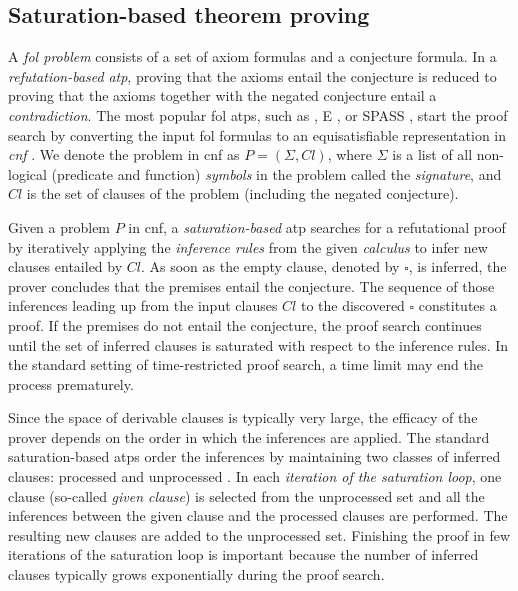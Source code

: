 
\subsection{Saturation-based theorem proving}
\label{sec:saturation}

A \emph{\acrfull{fol} problem} consists of a set of axiom formulas and a conjecture formula.
In a \emph{refutation-based} \emph{\acrfull{atp}},
proving that the axioms entail the conjecture
is reduced to proving that the axioms together with the negated conjecture entail a \emph{contradiction}.
The most popular \gls{fol} \glspl{atp}, such as \Vampire{} \cite{DBLP:conf/cav/KovacsV13}, E \cite{Schulz2019}, or SPASS \cite{DBLP:conf/cade/WeidenbachDFKSW09},
start the proof search by converting the input \gls{fol} formulas to an equisatisfiable representation in 
\emph{\acrfull{cnf}} \cite{DBLP:books/el/RV01/NonnengartW01,Harrison2009}.
We denote the problem in \gls{cnf} as $P = (\Sigma, \mathit{Cl})$,
where $\Sigma$ is a list of all non-logical (predicate and function)
\emph{symbols} in the problem called the \emph{signature},
and $\mathit{Cl}$ is the set of clauses of the problem (including the negated conjecture).

Given a problem $P$ in \gls{cnf},
a \emph{saturation-based} \gls{atp} searches for a refutational proof
by iteratively applying the \emph{inference rules} from the given \emph{calculus}
to infer new clauses entailed by $\mathit{Cl}$.
As soon as the empty clause, denoted by $\square$, is inferred,
the prover concludes that the premises entail the conjecture.
The sequence of those inferences leading up from the input clauses $\mathit{Cl}$ to the discovered $\square$ constitutes a proof.
If the premises do not entail the conjecture,
the proof search continues until
the set of inferred clauses is saturated with respect to the inference rules.
In the standard setting of time-restricted proof search, a time limit may end the process prematurely.

Since the space of derivable clauses is typically very large,
the efficacy of the prover depends on the order in which the inferences are applied.
The standard saturation-based \glspl{atp} order the inferences
by maintaining two classes of inferred clauses: processed and unprocessed \cite{Schulz2019}.
In each \emph{iteration of the saturation loop}, one clause (so-called \emph{given clause})
is selected from the unprocessed set
and all the inferences between the given clause and the processed clauses are performed.
The resulting new clauses are added to the unprocessed set.
Finishing the proof in few iterations of the saturation loop is important
because the number of inferred clauses typically grows exponentially during the proof search.

